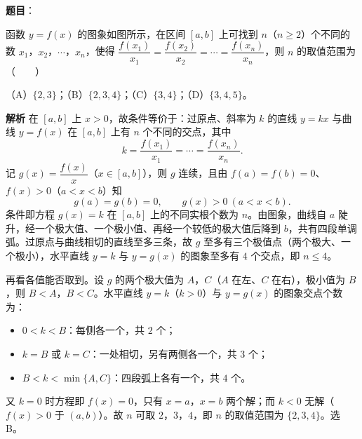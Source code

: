 \begin{answer}

\textbf{题目}：

函数 $y=f(x)$ 的图象如图所示，在区间 $[a,b]$ 上可找到 $n$（$n\geqslant2$）个不同的数 $x_1$，$x_2$，$\cdots$，$x_n$，使得 $\dfrac{f(x_1)}{x_1}=\dfrac{f(x_2)}{x_2}=\cdots=\dfrac{f(x_n)}{x_n}$，则 $n$ 的取值范围为\mbox{（　　）}
\nopagebreak[4]
\begin{center}\end{center}
\nopagebreak[4]
（A）$\{2,3\}$；（B）$\{2,3,4\}$；（C）$\{3,4\}$；（D）$\{3,4,5\}$。

\textbf{解析}
在 $[a,b]$ 上 $x>0$，故条件等价于：过原点、斜率为 $k$ 的直线 $y=kx$ 与曲线 $y=f(x)$ 在 $[a,b]$ 上有 $n$ 个不同的交点，其中
\nopagebreak[4]
\[k=\frac{f(x_1)}{x_1}=\cdots=\frac{f(x_n)}{x_n}.\]
记 $g(x)=\dfrac{f(x)}x$（$x\in[a,b]$），则 $g$ 连续，且由 $f(a)=f(b)=0$、$f(x)>0$（$a<x<b$）知
\nopagebreak[4]
\[g(a)=g(b)=0,\qquad g(x)>0\ (a<x<b).\]
条件即方程 $g(x)=k$ 在 $[a,b]$ 上的不同实根个数为 $n$。由图象，曲线自 $a$ 陡升，经一个极大值、一个极小值、再经一个较低的极大值后降到 $b$，共有四段单调弧。过原点与曲线相切的直线至多三条，故 $g$ 至多有三个极值点（两个极大、一个极小），水平直线 $y=k$ 与 $y=g(x)$ 的图象至多有 $4$ 个交点，即 $n\leqslant4$。

再看各值能否取到。设 $g$ 的两个极大值为 $A$，$C$（$A$ 在左、$C$ 在右），极小值为 $B$，则 $B<A$，$B<C$。水平直线 $y=k$（$k>0$）与 $y=g(x)$ 的图象交点个数为：

\begin{itemize}
\item $0<k<B$：每侧各一个，共 $2$ 个；
\item $k=B$ 或 $k=C$：一处相切，另有两侧各一个，共 $3$ 个；
\item $B<k<\min\{A,C\}$：四段弧上各有一个，共 $4$ 个。
\end{itemize}

又 $k=0$ 时方程即 $f(x)=0$，只有 $x=a$，$x=b$ 两个解；而 $k<0$ 无解（$f(x)>0$ 于 $(a,b)$）。故 $n$ 可取 $2$，$3$，$4$，即 $n$ 的取值范围为 $\{2,3,4\}$。选 B。


\end{answer}
